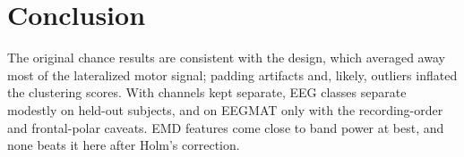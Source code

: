 \section{Conclusion}

The original chance results are consistent with the design, which averaged away most of the lateralized motor signal; padding artifacts and, likely, outliers inflated the clustering scores. With channels kept separate, EEG classes separate modestly on held-out subjects, and on EEGMAT only with the recording-order and frontal-polar caveats. EMD features come close to band power at best, and none beats it here after Holm's correction.
